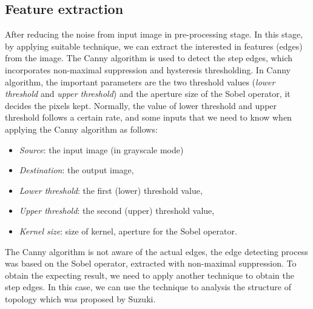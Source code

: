 \subsection{Feature extraction}
After reducing the noise from input image in pre-processing stage. In this stage, by applying suitable technique, we can extract the interested in features (edges) from the image. The Canny\cite{canny1986computational} algorithm is used to detect the step edges, which incorporates non-maximal suppression and hysteresis thresholding. In Canny algorithm, the important parameters are the two threshold values (\textit{lower threshold} and \textit{upper threshold}) and the aperture size of the Sobel operator, it decides the pixels kept. Normally, the value of lower threshold and upper threshold follows a certain rate, and some inputs that we need to know when applying the Canny algorithm as follows:
\begin{itemize}
\item \textit{Source}: the input image (in grayscale mode)
\item \textit{Destination}: the output image,
\item \textit{Lower threshold}: the first (lower) threshold value,
\item \textit{Upper threshold}: the second (upper) threshold value,
\item \textit{Kernel size}: size of kernel, aperture for the Sobel operator.
\end{itemize}
The Canny algorithm is not aware of the actual edges, the edge detecting process was based on the Sobel operator, extracted with non-maximal suppression. To obtain the expecting result, we need to apply another technique to obtain the step edges. In this case, we can use the technique to analysis the structure of topology which was proposed by Suzuki\cite{suzuki1985topological}.
